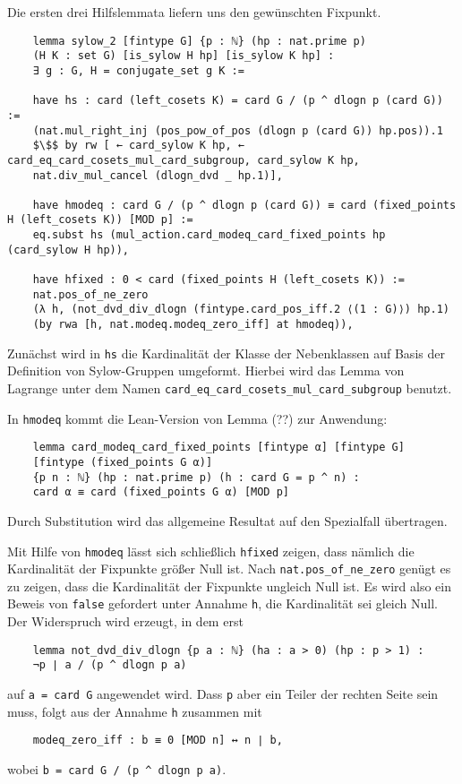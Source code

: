 \documentclass[a4paper,12pt]{scrartcl}
\newcommand{\ls}[1]{\lstinline|#1|}
\begin{document}
	Die ersten drei Hilfslemmata liefern uns den gewünschten Fixpunkt.
	\begin{lstlisting}
	lemma sylow_2 [fintype G] {p : ℕ} (hp : nat.prime p)
	(H K : set G) [is_sylow H hp] [is_sylow K hp] :
	∃ g : G, H = conjugate_set g K :=
	
	have hs : card (left_cosets K) = card G / (p ^ dlogn p (card G)) := 
	(nat.mul_right_inj (pos_pow_of_pos (dlogn p (card G)) hp.pos)).1
	$\$$ by rw [ ← card_sylow K hp, ← card_eq_card_cosets_mul_card_subgroup, card_sylow K hp, 
	nat.div_mul_cancel (dlogn_dvd _ hp.1)],
	
	have hmodeq : card G / (p ^ dlogn p (card G)) ≡ card (fixed_points H (left_cosets K)) [MOD p] := 
	eq.subst hs (mul_action.card_modeq_card_fixed_points hp (card_sylow H hp)),
	
	have hfixed : 0 < card (fixed_points H (left_cosets K)) := 
	nat.pos_of_ne_zero 
	(λ h, (not_dvd_div_dlogn (fintype.card_pos_iff.2 ⟨(1 : G)⟩) hp.1) 
	(by rwa [h, nat.modeq.modeq_zero_iff] at hmodeq)),
	\end{lstlisting}
	Zunächst wird in \lstinline|hs| die Kardinalität der Klasse der Nebenklassen auf Basis der Definition von Sylow-Gruppen umgeformt. Hierbei wird das Lemma von Lagrange unter dem Namen \ls{card_eq_card_cosets_mul_card_subgroup} benutzt.
	
	In \ls{hmodeq} kommt die Lean-Version von Lemma (??) zur Anwendung: 
	\begin{lstlisting}
	lemma card_modeq_card_fixed_points [fintype α] [fintype G] 
	[fintype (fixed_points G α)]
	{p n : ℕ} (hp : nat.prime p) (h : card G = p ^ n) : 
	card α ≡ card (fixed_points G α) [MOD p]
	\end{lstlisting}
	Durch Substitution wird das allgemeine Resultat auf den Spezialfall übertragen.
	
	Mit Hilfe von \ls{hmodeq} lässt sich schließlich \ls{hfixed} zeigen, dass nämlich die Kardinalität der Fixpunkte größer Null ist. Nach \ls{nat.pos_of_ne_zero} genügt es zu zeigen, dass die Kardinalität der Fixpunkte ungleich Null ist. Es wird also ein Beweis von \ls{false} gefordert unter Annahme \ls{h}, die Kardinalität sei gleich Null. Der Widerspruch wird erzeugt, in dem erst 
	\begin{lstlisting}	
	lemma not_dvd_div_dlogn {p a : ℕ} (ha : a > 0) (hp : p > 1) : 
	¬p ∣ a / (p ^ dlogn p a)
	\end{lstlisting}
	auf \ls{a = card G} angewendet wird. Dass \ls{p} aber ein Teiler der rechten Seite sein muss, folgt aus der Annahme \ls{h} zusammen mit
	\begin{lstlisting}
	modeq_zero_iff : b ≡ 0 [MOD n] ↔ n ∣ b,
	\end{lstlisting}
	wobei \ls{b = card G / (p ^ dlogn p a)}.
	
\end{document}
